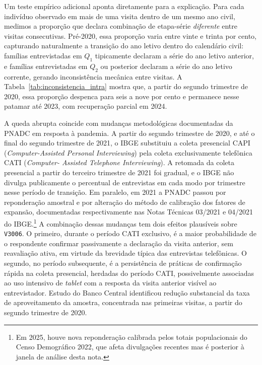 Um teste empírico adicional aponta diretamente para a
explicação. Para cada indivíduo observado em mais de uma
visita dentro de um mesmo ano civil, medimos a proporção
que declara combinação de etapa-série \emph{diferente}
entre visitas consecutivas. Pré-2020, essa proporção
varia entre vinte e trinta por cento, capturando
naturalmente a transição do ano letivo dentro do calendário
civil: famílias entrevistadas em $Q_1$ tipicamente declaram
a série do ano letivo anterior, e famílias entrevistadas em
$Q_2$ ou posterior declaram a série do ano letivo corrente,
gerando inconsistência mecânica entre visitas. A
Tabela~\ref{tab:inconsistencia_intra} mostra que, a partir
do segundo trimestre de 2020, essa proporção despenca para
seis a nove por cento e permanece nesse patamar até 2023,
com recuperação parcial em 2024.



A queda abrupta coincide com mudanças metodológicas
documentadas da PNADC em resposta à pandemia. A partir do
segundo trimestre de 2020, e até o final do segundo
trimestre de 2021, o IBGE substituiu a coleta presencial
CAPI (\emph{Computer-Assisted Personal Interviewing}) pela
coleta exclusivamente telefônica CATI (\emph{Computer-
Assisted Telephone Interviewing}). A retomada da coleta
presencial a partir do terceiro trimestre de 2021 foi
gradual, e o IBGE não divulga publicamente o percentual de
entrevistas em cada modo por trimestre nesse período de
transição. Em paralelo, em 2021 a PNADC passou por
reponderação amostral e por alteração do método de
calibração dos fatores de expansão, documentadas
respectivamente nas Notas Técnicas 03/2021 e 04/2021 do
IBGE.\footnote{Em 2025, houve nova reponderação calibrada
pelos totais populacionais do Censo Demográfico 2022, que
afeta divulgações recentes mas é posterior à janela de
análise desta nota.} A combinação dessas mudanças tem dois
efeitos plausíveis sobre \texttt{V3006}. O primeiro,
durante o período CATI exclusivo, é a maior probabilidade
de o respondente confirmar passivamente a declaração da
visita anterior, sem reavaliação ativa, em virtude da
brevidade típica das entrevistas telefônicas. O segundo,
no período subsequente, é a persistência de práticas de
confirmação rápida na coleta presencial, herdadas do
período CATI, possivelmente associadas ao uso intensivo
de \emph{tablet} com a resposta da visita anterior
visível ao entrevistador. Estudo do Banco Central
identificou redução substancial da taxa de aproveitamento
da amostra, concentrada nas primeiras visitas, a partir
do segundo trimestre de 2020.

